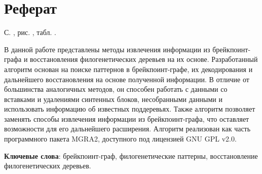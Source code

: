 \thispagestyle{empty}
\setcounter{page}{1}

\section*{Реферат}
\noindent
С. ,  рис. , табл. .

В данной работе представлены методы извлечения информации из брейкпоинт-графа и восстановления филогенетических деревьев на их основе.
Разработанный алгоритм основан на поиске паттернов в брейкпоинт-графе, их декодирования и дальнейшего восстановления на основе полученной информации.
В отличие от большинства аналогичных методов, он способен работать с данными со вставками и удалениями синтенных блоков, несобранными данными и
использовать информацию об известных поддеревьях.
Также алгоритм позволяет заменять способы извлечения информации из брейкпоинт-графа, что оставляет возможности для его дальнейшего расширения.
Алгоритм реализован как часть программного пакета MGRA2, доступного под лицензией GNU GPL v2.0.


\textbf{Ключевые слова}: брейкпоинт-граф, филогенетические паттерны, восстановление филогенетических деревьев.

\pagebreak

